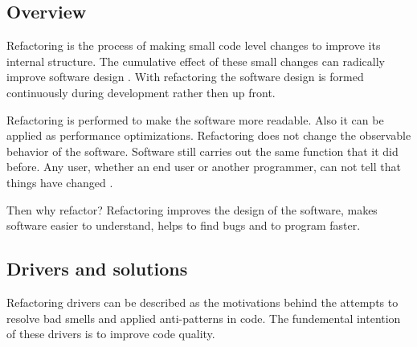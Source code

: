 \subsection{Overview}



Refactoring is the process of making small code level changes to improve its internal structure. The cumulative effect of these small changes can radically improve software design \cite{fowlerRefactor}. With refactoring the software design is formed continuously during development rather then up front. 

Refactoring is performed to make the software more readable. Also it can be applied as performance optimizations. Refactoring does not change the observable behavior of the software. Software still carries out the same function that it did before. Any user, whether an end user or another programmer, can not tell that things have changed \cite{fowlerRefactor}.  

Then why refactor? Refactoring improves the design of the software, makes software easier to understand, helps to find bugs and to program faster.

\subsection{Drivers and solutions}  
Refactoring drivers can be described as the motivations behind the attempts to resolve bad smells and applied anti-patterns in code. The fundemental intention of these drivers is to improve code quality. 


